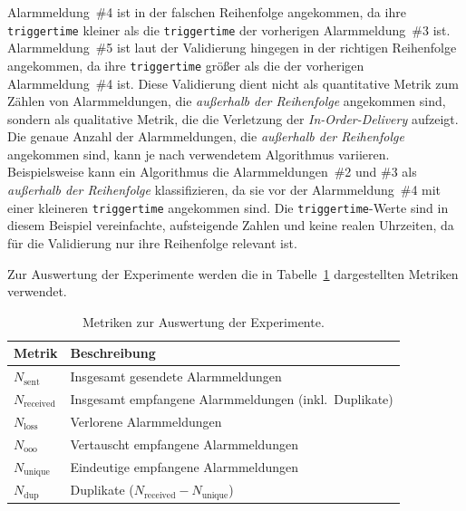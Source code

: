 \begin{itemize}
	      Alarmmeldung~\#4 ist in der falschen Reihenfolge angekommen, da ihre \texttt{triggertime} kleiner als die \texttt{triggertime} der vorherigen Alarmmeldung~\#3 ist. Alarmmeldung~\#5 ist laut der Validierung hingegen in der richtigen Reihenfolge angekommen, da ihre \texttt{triggertime} größer als die der vorherigen Alarmmeldung~\#4 ist. Diese Validierung dient nicht als quantitative Metrik zum Zählen von Alarmmeldungen, die \textit{außerhalb der Reihenfolge} angekommen sind, sondern als qualitative Metrik, die die Verletzung der \textit{In-Order-Delivery} aufzeigt. Die genaue Anzahl der Alarmmeldungen, die \textit{außerhalb der Reihenfolge} angekommen sind, kann je nach verwendetem Algorithmus variieren. Beispielsweise kann ein Algorithmus die Alarmmeldungen~\#2 und \#3 als \textit{außerhalb der Reihenfolge} klassifizieren, da sie vor der Alarmmeldung~\#4 mit einer kleineren \texttt{triggertime} angekommen sind. Die \texttt{triggertime}-Werte sind in diesem Beispiel vereinfachte, aufsteigende Zahlen und keine realen Uhrzeiten, da für die Validierung nur ihre Reihenfolge relevant ist.
\end{itemize}

\newpage

Zur Auswertung der Experimente werden die in Tabelle~\ref{tab:exp-metrics} dargestellten Metriken verwendet.

\begin{table}[H]
	\centering
	\caption{Metriken zur Auswertung der Experimente.}
	\label{tab:exp-metrics}
	\begin{tabular}{|l|l|}
		\hline
		\textbf{Metrik}       & \textbf{Beschreibung}                                 \\
		\hline
		$N_{\text{sent}}$     & Insgesamt gesendete Alarmmeldungen                    \\
		$N_{\text{received}}$ & Insgesamt empfangene Alarmmeldungen (inkl.~Duplikate) \\
		$N_{\text{loss}}$     & Verlorene Alarmmeldungen                              \\
		$N_{\text{ooo}}$      & Vertauscht empfangene Alarmmeldungen                  \\
		$N_{\text{unique}}$   & Eindeutige empfangene Alarmmeldungen                  \\
		$N_{\text{dup}}$      & Duplikate ($N_{\text{received}} - N_{\text{unique}}$) \\
		\hline
	\end{tabular}
\end{table}

